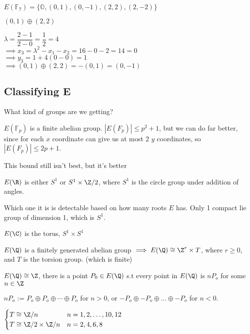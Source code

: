 \documentclass[twoside, 10pt]{article}
\newcommand{\F}{\mathbb{F}}
\renewcommand{\O}{\mathbb{O}}
\begin{document}
$E(\F_7) = \{\O, (0, 1), (0, -1), (2, 2), (2, -2)\}$

$(0, 1) \oplus (2, 2)$

$\lambda = \dfrac{2-1}{2-0} = \dfrac{1}{2} = 4$\\
$\implies x_3 = \lambda^2 - x_1 - x_2 = 16 - 0 - 2 = 14 = 0$\\
$\implies y_3 = 1 + 4(0 - 0) = 1$\\
$\implies (0, 1) \oplus (2, 2) = -(0, 1) = (0, -1)$

\subsection{Classifying E} What kind of groups are we getting?

\begin{exm*}
    $E(\F_p)$ is a finite abelian group. $|E(F_p)| \leq p^2 + 1$, but we can do far better, since for each $x$ coordinate can give us at most 2 $y$ coordinates, so $|E(F_p)| \leq 2p + 1$.
\end{exm*}
This bound still isn't best, but it's better

\begin{exm*}
    $E(\R)$ is either $S^1$ or $S^1 \times \Z/2$, where $S^1$ is the circle group under addition of angles.
\end{exm*}
Which one it is is detectable based on how many roots $E$ has. Only 1 compact lie group of dimension 1, which is $S^1$.

\begin{exm*}
    $E(\C)$ is the torus, $S^1 \times S^1$
\end{exm*}

\begin{thm}
    $E(\Q)$ is a finitely generated abelian group $\implies E(\Q) \cong \Z^r \times T$, where $r \geq 0$, and $T$ is the torsion group. (which is finite) %
\end{thm}


\begin{exm*}
    $E(\Q) \cong \Z$, there is a point $P_0 \in E(\Q)$ s.t every point in $E(\Q)$ is $nP_o$ for some $n\in \Z$
\end{exm*}
$nP_o$ := $P_o \oplus P_o \oplus \cdots \oplus P_o$ for $n > 0$, or $-P_o \oplus -P_o \oplus \ldots \oplus -P_o$ for $n < 0$.

\begin{thm}[Mazar, 1977]
    $\begin{cases}
        T \cong \Z/n & n = 1, 2, \ldots, 10, 12\\
        T \cong \Z/2 \times \Z/n & n = 2, 4, 6, 8\\
    \end{cases}$
\end{thm}
\end{document}
